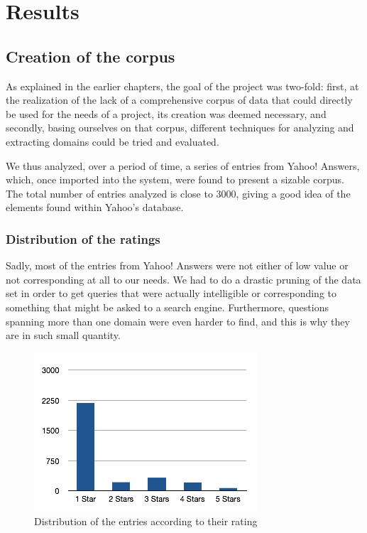 \chapter{Results} %
\label{cha:results}

\section{Creation of the corpus} %
\label{sec:creation_of_the_corpus_results}

As explained in the earlier chapters, the goal of the project was two-fold: first, at the realization of the lack of a comprehensive corpus of data that could directly be used for the needs of a project, its creation was deemed necessary, and secondly, basing ourselves on that corpus, different techniques for analyzing and extracting domains could be tried and evaluated.

We thus analyzed, over a period of time, a series of entries from Yahoo! Answers, which, once imported into the system, were found to present a sizable corpus. The total number of entries analyzed is close to 3000, giving a good idea of the elements found within Yahoo's database.

\subsection{Distribution of the ratings} %
\label{sub:distribution_of_the_ratings}

Sadly, most of the entries from Yahoo! Answers were not either of low value or not corresponding at all to our needs. We had to do a drastic pruning of the data set in order to get queries that were actually intelligible or corresponding to something that might be asked to a search engine. Furthermore, questions spanning more than one domain were even harder to find, and this is why they are in such small quantity.

\begin{figure}[ht!]
  \begin{center}
    \includegraphics{images/entriesdistribution}
  \end{center}
  \caption{Distribution of the entries according to their rating}\label{fig:entries_distribution}
\end{figure}

